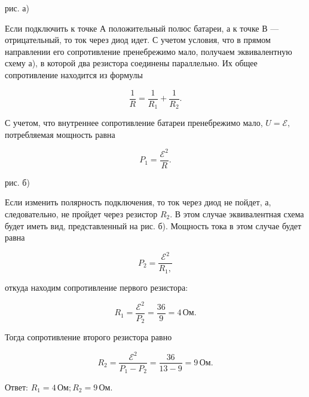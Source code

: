 \documentclass[12pt,a4paper]{article}
\begin{document}
{ рис. а) 

Если подключить к точке А положительный полюс батареи, а к точке В  — отрицательный, то ток через диод идет. С учетом условия, что в прямом направлении его сопротивление пренебрежимо мало, получаем эквивалентную схему а), в которой два резистора соединены параллельно. Их общее сопротивление находится из формулы 

\[\frac{1}{R} = \frac{1}{R_1} + \frac{1}{R_2} .\]

С учетом, что внутреннее сопротивление батареи пренебрежимо мало, $U= \mathcal{E} ,$ потребляемая мощность равна

\[P_1= \frac{\mathcal{E} ^2}{R} .\]



\begin{center}\end{center}

 рис. б) 

 Если изменить полярность подключения, то ток через диод не пойдет, а, следовательно, не пройдет через резистор $R_{2}$. В этом случае эквивалентная схема будет иметь вид, представленный на рис. б). Мощность тока в этом случае будет равна

\[P_2= \frac{\mathcal{E} ^2}{R_1,}\]

откуда находим сопротивление первого резистора:

\[R_1= \frac{\mathcal{E} ^2}{P_2} = \frac{36}{9} =4\,\text{Ом}.\]

Тогда сопротивление второго резистора равно

\[R_2= \frac{\mathcal{E} ^2}{P_1 - P_2} = \frac{36}{13 - 9} =9\,\text{Ом}.\]

Ответ: $R_1=4\,\text{Ом}; R_2=9\,\text{Ом}.$
}
\end{document}
